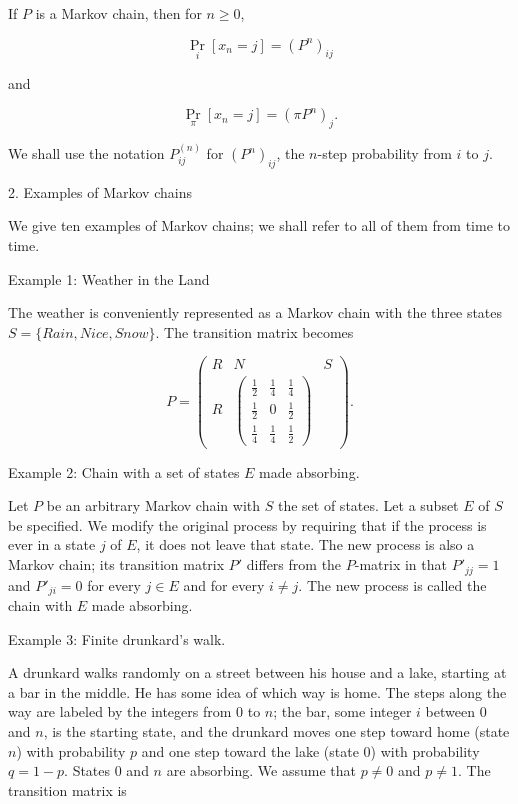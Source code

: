 If $P$ is a Markov chain, then for $n \geq 0$,

$$\Pr_i[x_n = j] = (P^n)_{ij}$$

and

$$\Pr_\pi[x_n = j] = (\pi P^n)_{j}.$$

We shall use the notation $P_{ij}^{(n)}$ for $(P^n)_{ij}$, the $n$-step probability from $i$ to $j$.

2. Examples of Markov chains

We give ten examples of Markov chains; we shall refer to all of them from time to time.

Example 1: Weather in the Land

The weather is conveniently represented as a Markov chain with the three states $S = \{Rain, Nice, Snow\}$. The transition matrix becomes

$$P = \begin{pmatrix}
R & N & S \\
R & \left( \begin{array}{ccc} \frac{1}{2} & \frac{1}{4} & \frac{1}{4} \\ \frac{1}{2} & 0 & \frac{1}{2} \\ \frac{1}{4} & \frac{1}{4} & \frac{1}{2} \end{array} \right) \end{pmatrix}.$$

Example 2: Chain with a set of states $E$ made absorbing.

Let $P$ be an arbitrary Markov chain with $S$ the set of states. Let a subset $E$ of $S$ be specified. We modify the original process by requiring that if the process is ever in a state $j$ of $E$, it does not leave that state. The new process is also a Markov chain; its transition matrix $P'$ differs from the $P$-matrix in that $P'_{jj} = 1$ and $P'_{ji} = 0$ for every $j \in E$ and for every $i \neq j$. The new process is called the chain with $E$ made absorbing.

Example 3: Finite drunkard's walk.

A drunkard walks randomly on a street between his house and a lake, starting at a bar in the middle. He has some idea of which way is home. The steps along the way are labeled by the integers from 0 to $n$; the bar, some integer $i$ between 0 and $n$, is the starting state, and the drunkard moves one step toward home (state $n$) with probability $p$ and one step toward the lake (state 0) with probability $q = 1 - p$. States 0 and $n$ are absorbing. We assume that $p \neq 0$ and $p \neq 1$. The transition matrix is

